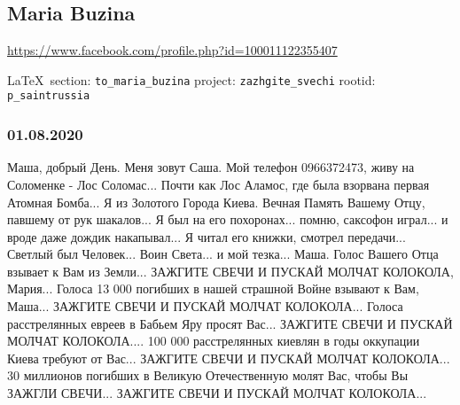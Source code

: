  
 
\subsection{Maria Buzina}
\url{https://www.facebook.com/profile.php?id=100011122355407}
  
\vspace{0.5cm}
{\small\LaTeX~section: \verb|to_maria_buzina| project: \verb|zazhgite_svechi| rootid: \verb|p_saintrussia|}
\vspace{0.5cm}

\subsubsection{01.08.2020}

Маша, добрый День. Меня зовут Саша.  Мой телефон 0966372473, живу на Соломенке
- Лос Соломас... Почти как Лос Аламос, где была взорвана первая Атомная
Бомба... Я из Золотого Города Киева. Вечная Память Вашему Отцу, павшему от рук
шакалов... Я был на его похоронах... помню, саксофон играл... и вроде даже
дождик накапывал... Я читал его книжки, смотрел передачи... Светлый был
Человек... Воин Света... и мой тезка... Маша. Голос Вашего Отца взывает к Вам
из Земли... ЗАЖГИТЕ СВЕЧИ И ПУСКАЙ МОЛЧАТ КОЛОКОЛА, Мария... Голоса 13 000
погибших в нашей страшной Войне взывают к Вам, Маша... ЗАЖГИТЕ СВЕЧИ И ПУСКАЙ
МОЛЧАТ КОЛОКОЛА... Голоса расстрелянных евреев в Бабьем Яру просят Вас...
ЗАЖГИТЕ СВЕЧИ И ПУСКАЙ МОЛЧАТ КОЛОКОЛА.... 100 000 расстрелянных киевлян в годы
оккупации Киева требуют от Вас... ЗАЖГИТЕ СВЕЧИ И ПУСКАЙ МОЛЧАТ КОЛОКОЛА... 30
миллионов погибших в Великую Отечественную молят Вас, чтобы Вы ЗАЖГЛИ СВЕЧИ...
ЗАЖГИТЕ СВЕЧИ И ПУСКАЙ МОЛЧАТ КОЛОКОЛА...
  

